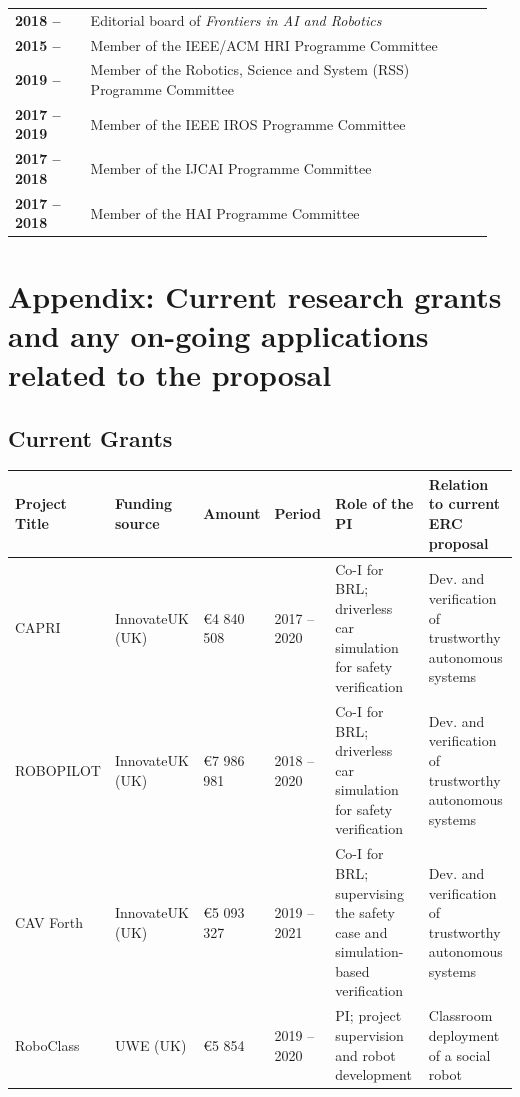 \documentclass[11pt,a4paper]{report}
\begin{document}
\begin{tabular}{p{0.15\linewidth}p{0.8\linewidth}}
    \bf 2018 -- & Editorial board of \emph{Frontiers in AI and Robotics} \\
    \bf 2015 --  & Member of the IEEE/ACM HRI Programme Committee \\
    \bf 2019 --  & Member of the Robotics, Science and System (RSS) Programme Committee  \\
    \bf 2017 -- 2019 & Member of the IEEE IROS Programme Committee  \\
    \bf 2017 -- 2018 & Member of the IJCAI Programme Committee  \\
    \bf 2017 -- 2018 & Member of the HAI Programme Committee  \\
\end{tabular}




\newpage

\section{Appendix: Current research grants and any on-going applications related
to the proposal}

\subsection{Current Grants}

\begin{tabular}{llllp{4cm}p{4cm}}
\toprule
\textbf{Project Title} & \textbf{Funding source} & \textbf{Amount} & \textbf{Period} & \textbf{Role of the PI} & \textbf{Relation to current  ERC proposal} \\ \midrule
    CAPRI & InnovateUK (UK) & €4 840 508 & 2017 -- 2020 & Co-I for BRL; driverless car simulation for safety verification & Dev. and verification of trustworthy autonomous systems \\ \midrule
    ROBOPILOT & InnovateUK (UK) & €7 986 981 & 2018 -- 2020 & Co-I for BRL; driverless car simulation for safety verification & Dev. and verification of trustworthy autonomous systems \\ \midrule
    CAV Forth & InnovateUK (UK) & €5 093 327 & 2019 -- 2021 & Co-I for BRL; supervising the safety case and simulation-based verification & Dev. and verification of trustworthy autonomous systems \\ \midrule
    RoboClass & UWE (UK) & €5 854 & 2019 -- 2020 & PI; project supervision and robot development & Classroom deployment of a social robot \\ \bottomrule
\end{tabular}
\end{document}
